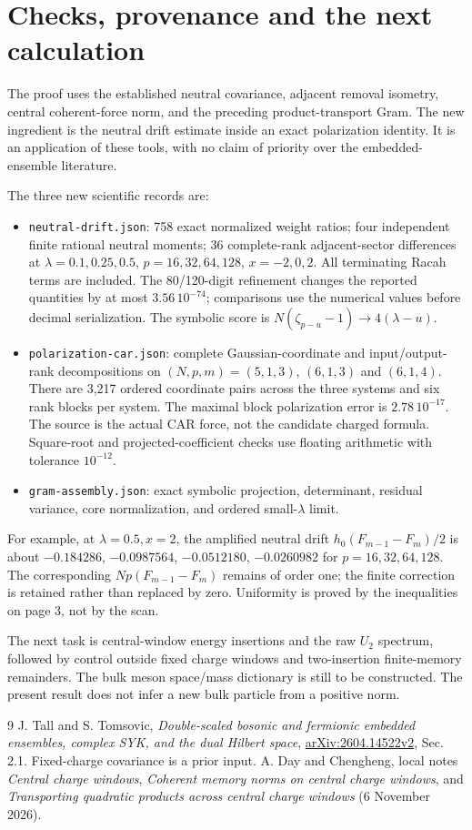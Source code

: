 \documentclass[11pt,a4paper]{article}
\begin{document}
\newpage
\section{Checks, provenance and the next calculation}
The proof uses the established neutral covariance, adjacent removal
isometry, central coherent-force norm, and the preceding
product-transport Gram. The new ingredient is the neutral drift
estimate inside an exact polarization identity. It is an application
of these tools, with no claim of priority over the embedded-ensemble
literature.

The three new scientific records are:
\begin{itemize}
 \item \texttt{neutral-drift.json}: 758 exact normalized weight
 ratios; four independent finite rational neutral moments;
 36 complete-rank adjacent-sector differences at
 $\lambda=0.1,0.25,0.5$, $p=16,32,64,128$, $x=-2,0,2$.
 All terminating Racah terms are included. The 80/120-digit
 refinement changes the reported quantities by at most
 $3.56\,10^{-74}$; comparisons use the numerical values before
 decimal serialization. The symbolic score is
 $N(\zeta_{p-u}-1)\to4(\lambda-u)$.
 \item \texttt{polarization-car.json}: complete Gaussian-coordinate
 and input/output-rank decompositions on $(N,p,m)=(5,1,3)$,
 $(6,1,3)$ and $(6,1,4)$. There are 3,217 ordered coordinate
 pairs across the three systems and six rank blocks per system.
 The maximal block polarization error is $2.78\,10^{-17}$.
 The source is the actual CAR force, not the candidate charged
 formula. Square-root and projected-coefficient checks use
 floating arithmetic with tolerance $10^{-12}$.
 \item \texttt{gram-assembly.json}: exact symbolic projection,
 determinant, residual variance, core normalization, and ordered
 small-$\lambda$ limit.
\end{itemize}
For example, at $\lambda=0.5,x=2$, the amplified neutral drift
$h_0(F_{m-1}-F_m)/2$ is about $-0.184286$, $-0.0987564$,
$-0.0512180$, $-0.0260982$ for $p=16,32,64,128$.
The corresponding $Np(F_{m-1}-F_m)$ remains of order one;
the finite correction is retained rather than replaced by zero.
Uniformity is proved by the inequalities on page 3, not by the scan.

The next task is central-window energy insertions and the raw
$U_2$ spectrum, followed by control outside fixed charge windows
and two-insertion finite-memory remainders. The bulk meson
space/mass dictionary is still to be constructed. The present
result does not infer a new bulk particle from a positive norm.

\begin{thebibliography}{9}
 J. Tall and S. Tomsovic,
\emph{Double-scaled bosonic and fermionic embedded ensembles,
complex SYK, and the dual Hilbert space},
\href{https://arxiv.org/html/2604.14522v2}{arXiv:2604.14522v2},
Sec. 2.1. Fixed-charge covariance is a prior input.
 A. Day and Chengheng, local notes
\emph{Central charge windows}, \emph{Coherent memory norms on
central charge windows}, and \emph{Transporting quadratic products
across central charge windows} (6 November 2026).
\end{thebibliography}
\end{document}
